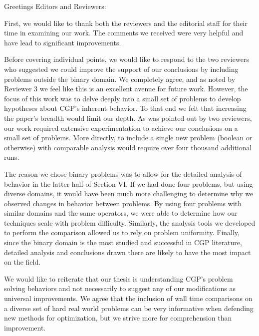 \documentclass{letter}
\begin{document}
\begin{letter}{}
\opening{Greetings Editors and Reviewers:}

First, we would like to thank both the reviewers and the editorial staff for their
time in examining our work.  The comments we received were very helpful and
have lead to significant improvements.

Before covering individual points, we would like to respond to the two
reviewers who suggested we could improve the support of our conclusions by
including problems outside the binary domain.  We completely agree, and as
noted by Reviewer 3 we feel like this is an excellent avenue for future work.  However,
the focus of this work was to delve deeply into a small set of problems to
develop hypotheses about CGP's inherent behavior.  To that
end we felt that increasing the paper's breadth would limit our depth.  As was
pointed out by two reviewers, our work required extensive experimentation
to achieve our conclusions on a small set of problems.  More directly, to
include a single new problem (boolean or otherwise) with
comparable analysis would require over four thousand additional runs.

The reason we chose binary problems was to allow for the
detailed analysis of behavior in the latter half of Section VI.  If we had done
four problems, but using diverse domains, it would have been much more challenging
to determine why we observed changes in behavior between problems.  By using
four problems with similar domains and the same operators, we were able to determine
how our techniques scale with problem difficulty.  Similarly, the analysis tools
we developed to perform the comparison allowed us to rely on problem uniformity.
Finally, since the binary domain is
the most studied and successful in CGP literature, detailed analysis and conclusions drawn there
are likely to have the most impact on the field.

We would like to reiterate that our thesis is understanding
CGP's problem solving behaviors and not necessarily to suggest any of our modifications
as universal improvements.  We agree that the inclusion of wall time comparisons on a diverse
set of hard real world problems can be very informative when defending new methods
for optimization, but we strive more for comprehension than improvement.


\end{letter}
\end{document}
